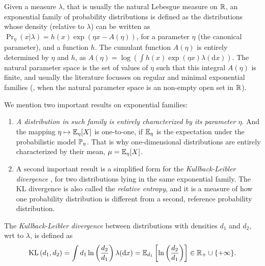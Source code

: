 Given a measure $\lambda$, that is usually the natural Lebesgue measure on $\mathbb{R}$, an exponential family of probability distributions is defined as the distributions whose density (relative to $\lambda$) can be written as
$ \Pr_{\eta}(x | \lambda) = h(x) \exp \left( \eta x - A(\eta) \right)$,
for a parameter $\eta$ (the canonical parameter),
and a function $h$.
The cumulant function $A(\eta)$ is entirely determined by $\eta$ and $h$,
as $A(\eta) = \log \left( \int h(x) \exp(\eta x) \lambda(\mathrm{d} x) \right)$.
%
The natural parameter space is the set of values of $\eta$ such that this integral $A(\eta)$ is finite,
and usually the literature focusses on regular and minimal exponential families (\ie, when the natural parameter space is an non-empty open set in $\mathbb{R}$).

We mention two important results on exponential families:

\begin{enumerate}
    \item
    \emph{A distribution in such family is entirely characterized by its parameter $\eta$}.
    And the mapping $\eta \mapsto \mathbb{E}_{\eta}[X]$ is one-to-one,
    if $\mathbb{E}_{\eta}$ is the expectation under the probabilistic model $\mathbb{P}_{\eta}$.
    That is why one-dimensional distributions are entirely characterized by their mean, $\mu = \mathbb{E}_{\eta}[X]$.

    \item
    A second important result is a simplified form for the \emph{Kullback-Leibler divergence} \cite{KullbackLeibler51}, for two distributions lying in the same exponential family.
    The KL divergence is also called the \emph{relative entropy},
    and it is a measure of how one probability distribution is different from a second, reference probability distribution.
\end{enumerate}

\begin{definition}\label{def:2:KLDivergence}
\begin{leftbar}[defnbar]  %
    The \emph{Kullback-Leibler divergence} between distributions
    with densities $d_1$ and $d_2$, wrt to $\lambda$, is defined as
    \begin{align}\label{eq:2:Kullback-LeiblerDivergenceExpFamily1}
        \mathrm{KL}\left(d_1, d_2\right) \overset{.}{=} \int d_1 \ln\left(\frac{d_2}{d_1}\right) \lambda(\mathrm{d}x) = \mathbb{E}_{d_1} \left[ \ln\left(\frac{d_2}{d_1}\right) \right] \in \mathbb{R}_{+}\cup\{+\infty\}.
    \end{align}
\end{leftbar}  %
\end{definition}


